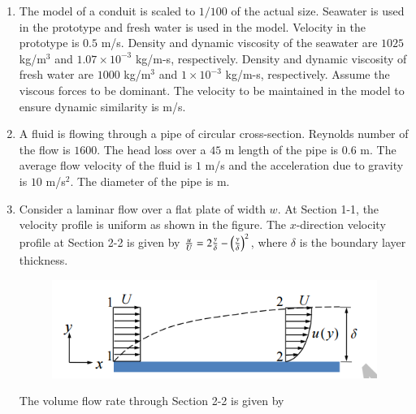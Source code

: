 \documentclass[a4paper,10pt]{article}
\begin{document}
\begin{enumerate}
    \hfill{}

    \item The model of a conduit is scaled to $1/100$ of the actual size. Seawater is used in the prototype and fresh water is used in the model. Velocity in the prototype is $0.5$ m/s. Density and dynamic viscosity of the seawater are $1025$ kg/m$^3$ and $1.07 \times 10^{-3}$ kg/m-s, respectively. Density and dynamic viscosity of fresh water are $1000$ kg/m$^3$ and $1 \times 10^{-3}$ kg/m-s, respectively. Assume the viscous forces to be dominant. The velocity to be maintained in the model to ensure dynamic similarity is \underline{\hspace{2cm}} m/s.
    
    \hfill{}

    \item A fluid is flowing through a pipe of circular cross-section. Reynolds number of the flow is $1600$. The head loss over a $45$ m length of the pipe is $0.6$ m. The average flow velocity of the fluid is $1$ m/s and the acceleration due to gravity is $10$ m/s$^2$. The diameter of the pipe is \underline{\hspace{2cm}} m.
    
    \hfill{}

    \item Consider a laminar flow over a flat plate of width $w$. At Section 1-1, the velocity profile is uniform as shown in the figure. The $x$-direction velocity profile at Section 2-2 is given by $\frac{u}{U} = 2\frac{y}{\delta} - \left(\frac{y}{\delta}\right)^2$, where $\delta$ is the boundary layer thickness.
    \begin{figure}[H] \centering \includegraphics[width=0.7\columnwidth]{Bq20.png} \caption*{} \label{fig:q20_fluid} \end{figure}
    The volume flow rate through Section 2-2 is given by
    
    \hfill{}
    \begin{enumerate}[label=\Alph*)]
    \end{enumerate}
    

\end{enumerate}
\end{document}
